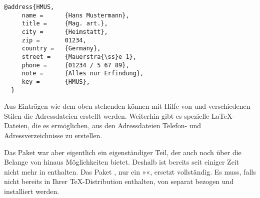 \begin{lstlisting}[morekeywords={@address}]
  @address{HMUS,
     name =      {Hans Mustermann},
     title =     {Mag. art.},
     city =      {Heimstatt},
     zip =       01234,
     country =   {Germany},
     street =    {Mauerstra{\ss}e 1},
     phone =     {01234 / 5 67 89},
     note =      {Alles nur Erfindung},
     key =       {HMUS},
  }
\end{lstlisting}

Aus Einträgen wie dem oben stehenden können mit Hilfe
von \BibTeX{} und verschiedenen \BibTeX-Stilen die
Adressdateien erstellt werden.
Weiterhin gibt es spezielle \LaTeX-Dateien, die es ermöglichen,
aus den Adressdateien Telefon- und Adressverzeichnisse
zu erstellen.

Das Paket  war aber eigentlich ein eigenständiger Teil, der
auch noch über die Belange von \KOMAScript{} hinaus Möglichkeiten bietet.
Deshalb ist  bereits seit einiger Zeit nicht mehr in
\KOMAScript{} enthalten.  Das Paket , nur ein »«,
ersetzt  vollständig. Es muss, falls nicht bereits in Ihrer
\TeX-Distribution enthalten, von \cite{package:adrconv} separat bezogen und
installiert werden.

